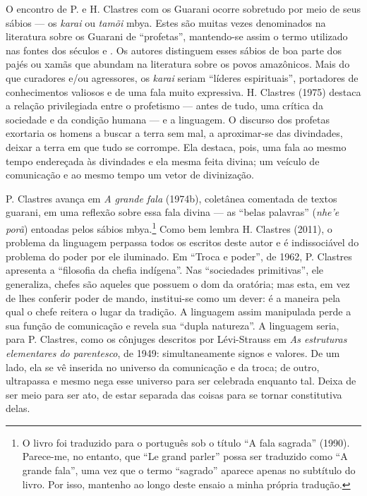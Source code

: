 {{O encontro de P. e H. Clastres com os Guarani ocorre sobretudo por meio
de seus sábios --- os \emph{karai} ou \emph{tamõi} mbya. Estes são muitas vezes
denominados na literatura sobre os Guarani de ``profetas'', mantendo-se
assim o termo utilizado nas fontes dos séculos  e . Os autores
distinguem esses sábios de boa parte dos pajés ou xamãs que abundam na
literatura sobre os povos amazônicos. Mais do que curadores e/ou
agressores, os \emph{karai} seriam ``líderes espirituais'', portadores de
conhecimentos valiosos e de uma fala muito expressiva. H. Clastres
(1975) destaca a relação privilegiada entre o profetismo --- antes de
tudo, uma crítica da sociedade e da condição humana --- e a linguagem. O
discurso dos profetas exortaria os homens a buscar a terra sem mal, a
aproximar-se das divindades, deixar a terra em que tudo se corrompe.
Ela destaca, pois, uma fala ao mesmo tempo endereçada às divindades e
ela mesma feita divina; um veículo de comunicação e ao mesmo tempo um
vetor de divinização.

P. Clastres avança em \emph{A grande fala} (1974b), coletânea comentada de
textos guarani, em uma reflexão sobre essa fala divina --- as ``belas
palavras'' (\emph{nhe’e porã}) entoadas pelos sábios mbya.\footnote{O livro foi
traduzido para o português sob o título ``A fala sagrada'' (1990).
Parece-me, no entanto, que ``Le grand parler'' possa ser traduzido como
``A grande fala'', uma vez que o termo ``sagrado'' aparece apenas no
subtítulo do livro. Por isso, mantenho ao longo deste ensaio a minha
própria tradução.} Como bem lembra H. Clastres (2011), o problema da
linguagem perpassa todos os escritos deste autor e é indissociável do
problema do poder por ele iluminado. Em ``Troca e poder'', de 1962, P.
Clastres apresenta a ``filosofia da chefia indígena''. Nas ``sociedades
primitivas'', ele generaliza, chefes são aqueles que possuem o dom da
oratória; mas esta, em vez de lhes conferir poder de mando, institui-se
como um dever: é a maneira pela qual o chefe reitera o lugar da
tradição. A linguagem assim manipulada perde a sua função de
comunicação e revela sua ``dupla natureza''. A linguagem seria, para P.
Clastres, como os cônjuges descritos por Lévi-Strauss em \emph{As estruturas
elementares do parentesco}, de 1949: simultaneamente signos e valores.
De um lado, ela se vê inserida no universo da comunicação e da troca;
de outro, ultrapassa e mesmo nega esse universo para ser celebrada
enquanto tal. Deixa de ser meio para ser ato, de estar separada das
coisas para se tornar constitutiva delas. 

}}
